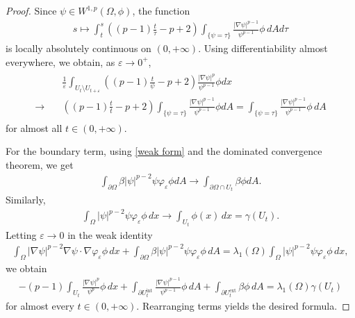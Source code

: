 \documentclass[11pt,leqno]{amsart}
\def\p{\partial}
\def \p {\partial}
\numberwithin{equation}{section}
\begin{document}
\begin{proof}
   Since $\psi \in W^{1,p}(\Omega, \phi )$,   the function
\begin{align*}
s \mapsto \int_t^s \left( (p-1)\frac{t}{\tau} - p + 2 \right) \int_{\{\psi=\tau\}} \frac{|\nabla \psi|^{p-1}}{\psi^{p-1}} \phi\, dA d\tau
\end{align*}
is locally absolutely continuous on $(0,+\infty)$. Using differentiability almost everywhere, we obtain, as $\varepsilon \to 0^+$,
\begin{align*}
\begin{split}
&\frac{1}{\varepsilon} \int_{U_t \setminus U_{t+\varepsilon}} \left( (p-1)\frac{t}{\psi} - p + 2 \right) \frac{|\nabla \psi|^p}{\psi^{p-1}}\phi  dx \\
\to \quad &\left( (p-1)\frac{t}{t} - p + 2 \right) \int_{\{\psi=\tau\}} \frac{|\nabla \psi|^{p-1}}{\psi^{p-1}}\phi dA = \int_{\{\psi=\tau\}} \frac{|\nabla \psi|^{p-1}}{\psi^{p-1}} \phi\, dA
\end{split}
\end{align*}
for almost all $t \in (0,+\infty)$.


For the boundary term, using \eqref{weak form} and  the dominated convergence theorem, we get
\begin{align*}
\int_{\partial \Omega} \beta |\psi|^{p-2} \psi \varphi_\varepsilon \phi dA \to \int_{\partial \Omega \cap U_{t}} \beta \phi dA.
\end{align*}
Similarly,
\begin{align*}
\int_{\Omega} |\psi|^{p-2} \psi \varphi_\varepsilon \phi \, dx \to \int_{U_t}  \phi (x)\, dx = \gamma(U_t).
\end{align*}
Letting $\varepsilon \to 0$ in  the weak identity
\begin{align*}
\int_{\Omega} |\nabla \psi|^{p-2} \nabla \psi \cdot \nabla \varphi_{\varepsilon} \phi\, dx + \int_{\partial \Omega} \beta |\psi|^{p-2} \psi \varphi_{\varepsilon} \phi \,dA = \lambda_1(\Omega) \int_{\Omega} |\psi|^{p-2} \psi \varphi_{\varepsilon} \phi\, dx,
\end{align*}
we obtain
\begin{align*}
-(p-1) \int_{U_t} \frac{|\nabla \psi|^p}{\psi^p}\phi \, dx + \int_{\partial U_t^{\mathrm{int}}} \frac{|\nabla \psi|^{p-1}}{\psi^{p-1}}\phi  \,dA + \int_{\p U_t^{\mathrm{ext}}} \beta \phi \,dA = \lambda_1(\Omega) \gamma(U_t)
\end{align*}
for almost every $t \in (0, +\infty)$.  Rearranging terms yields the desired formula. \end{proof}
\end{document}
